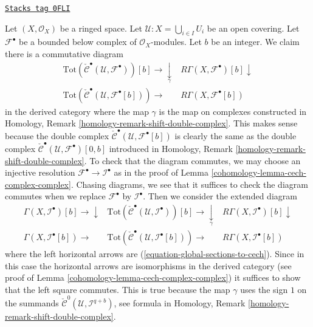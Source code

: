 \begin{remark}
\label{cohomology-remark-shift-complex-cech-complex}
\href{https://stacks.math.columbia.edu/tag/0FLI}{\texttt{Stacks tag 0FLI}}

Let $(X, \mathcal{O}_X)$ be a ringed space. Let
$\mathcal{U} : X = \bigcup_{i \in I} U_i$ be
an open covering. Let $\mathcal{F}^\bullet$ be a bounded below complex
of $\mathcal{O}_X$-modules. Let $b$ be an integer.
We claim there is a commutative diagram
$$
\begin{array}{cc}\text{Tot}(\check{\mathcal{C}}^\bullet(\mathcal{U}, \mathcal{F}^\bullet))[b]
\longrightarrow\underset{\gamma}{\downarrow} & R\Gamma(X, \mathcal{F}^\bullet)[b] \downarrow \\ \text{Tot}(\check{\mathcal{C}}^\bullet(\mathcal{U}, \mathcal{F}^\bullet[b]))
\longrightarrow & R\Gamma(X, \mathcal{F}^\bullet[b])\end{array}
$$
in the derived category where the map $\gamma$ is the map on complexes
constructed in Homology, Remark \ref{homology-remark-shift-double-complex}.
This makes sense because the double complex
$\check{\mathcal{C}}^\bullet(\mathcal{U}, \mathcal{F}^\bullet[b])$
is clearly the same as the double complex
$\check{\mathcal{C}}^\bullet(\mathcal{U}, \mathcal{F}^\bullet)[0, b]$
introduced in Homology, Remark \ref{homology-remark-shift-double-complex}.
To check that the diagram commutes, we may choose an injective resolution
$\mathcal{F}^\bullet \to \mathcal{I}^\bullet$ as in the proof of
Lemma \ref{cohomology-lemma-cech-complex-complex}. Chasing diagrams, we see that
it suffices to check the diagram commutes when we replace $\mathcal{F}^\bullet$
by $\mathcal{I}^\bullet$. Then we consider the extended diagram
$$
\begin{array}{ccc}\Gamma(X, \mathcal{I}^\bullet)[b] \longrightarrow\downarrow & \text{Tot}(\check{\mathcal{C}}^\bullet(\mathcal{U}, \mathcal{I}^\bullet))[b]
\longrightarrow\underset{\gamma}{\downarrow} & R\Gamma(X, \mathcal{I}^\bullet)[b] \downarrow \\ \Gamma(X, \mathcal{I}^\bullet[b]) \longrightarrow & \text{Tot}(\check{\mathcal{C}}^\bullet(\mathcal{U}, \mathcal{I}^\bullet[b]))
\longrightarrow & R\Gamma(X, \mathcal{I}^\bullet[b])\end{array}
$$
where the left horizontal arrows are (\ref{equation-global-sections-to-cech}).
Since in this case the horizontal arrows are isomorphisms in the derived
category (see proof of Lemma \ref{cohomology-lemma-cech-complex-complex}) it
suffices to show that the left square commutes. This is true because
the map $\gamma$ uses the sign $1$ on the summands
$\check{\mathcal{C}}^0(\mathcal{U}, \mathcal{I}^{q + b})$, see
formula in Homology, Remark \ref{homology-remark-shift-double-complex}.
\end{remark}

